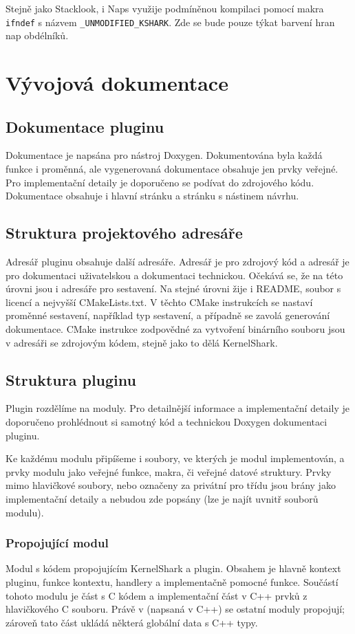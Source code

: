 Stejně jako Stacklook, i Naps využije podmíněnou kompilaci pomocí makra \texttt{ifndef} s názvem \texttt{\_UNMODIFIED\_KSHARK}. Zde se bude pouze týkat barvení hran nap obdélníků.

\section{Vývojová dokumentace}

\subsection*{Dokumentace pluginu}
Dokumentace je napsána pro nástroj Doxygen. Dokumentována byla každá funkce i proměnná, ale vygenerovaná dokumentace obsahuje jen prvky veřejné. Pro implementační detaily je doporučeno se podívat do zdrojového kódu. Dokumentace obsahuje i hlavní stránku a stránku s nástinem návrhu.

\subsection*{Struktura projektového adresáře}

Adresář pluginu obsahuje další adresáře. Adresář  je pro zdrojový kód a adresář  je pro dokumentaci uživatelskou a dokumentaci technickou. Očekává se, že na této úrovni jsou i adresáře pro sestavení. Na stejné úrovni žije i README, soubor s licencí a nejvyšší CMakeLists.txt. V těchto CMake instrukcích se nastaví proměnné sestavení, například typ sestavení, a případně se zavolá generování dokumentace. CMake instrukce zodpovědné za vytvoření binárního souboru jsou v adresáři se zdrojovým kódem, stejně jako to dělá KernelShark.

\subsection*{Struktura pluginu}
Plugin rozdělíme na moduly. Pro detailnější informace a implementační detaily je doporučeno prohlédnout si samotný kód a technickou Doxygen dokumentaci pluginu.

Ke každému modulu připíšeme i soubory, ve kterých je modul implementován, a prvky modulu jako veřejné funkce, makra, či veřejné datové struktury. Prvky mimo hlavičkové soubory, nebo označeny za privátní pro třídu jsou brány jako implementační detaily a nebudou zde popsány (lze je najít uvnitř souborů modulu).

\subsubsection*{Propojující modul}
Modul s kódem propojujícím KernelShark a plugin. Obsahem je hlavně kontext pluginu, funkce kontextu, handlery a implementačně pomocné funkce. Součástí tohoto modulu je část s C kódem a implementační část v C++ prvků z hlavičkového C souboru. Právě v  (napsaná v C++) se ostatní moduly propojují; zároveň tato část ukládá některá globální data s C++ typy.

